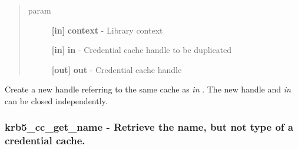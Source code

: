 \documentclass[letterpaper,10pt,english]{sphinxmanual}
\begin{document}
\begin{fulllineitems}
\label{appdev/refs/api/krb5_cc_dup:c.krb5_cc_dup}
\end{fulllineitems}

\begin{quote}\begin{description}
\item[{param}] \leavevmode
\textbf{{[}in{]}} \textbf{context} - Library context

\textbf{{[}in{]}} \textbf{in} - Credential cache handle to be duplicated

\textbf{{[}out{]}} \textbf{out} - Credential cache handle

\end{description}\end{quote}

Create a new handle referring to the same cache as \emph{in} . The new handle and \emph{in} can be closed independently.


\subsubsection{krb5\_cc\_get\_name -  Retrieve the name, but not type of a credential cache.}
\label{appdev/refs/api/krb5_cc_get_name::doc}\label{appdev/refs/api/krb5_cc_get_name:krb5-cc-get-name-retrieve-the-name-but-not-type-of-a-credential-cache}

\begin{fulllineitems}
\label{appdev/refs/api/krb5_cc_get_name:c.krb5_cc_get_name}
\end{fulllineitems}
\end{document}

